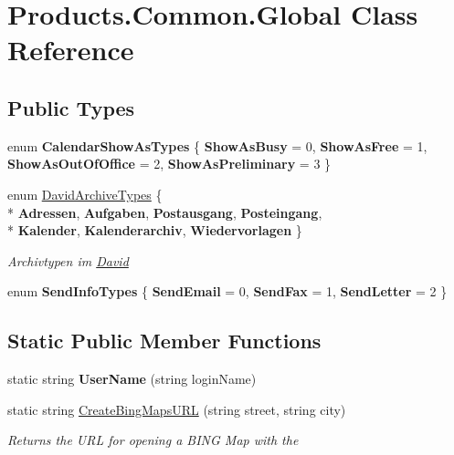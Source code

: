 \hypertarget{class_products_1_1_common_1_1_global}{}\section{Products.\+Common.\+Global Class Reference}
\label{class_products_1_1_common_1_1_global}
\subsection*{Public Types}
\begin{DoxyCompactItemize}
\item 
enum {\bfseries Calendar\+Show\+As\+Types} \{ {\bfseries Show\+As\+Busy} = 0, 
{\bfseries Show\+As\+Free} = 1, 
{\bfseries Show\+As\+Out\+Of\+Office} = 2, 
{\bfseries Show\+As\+Preliminary} = 3
 \}\hypertarget{class_products_1_1_common_1_1_global_a44e81ad1d5e09c7b93cf42c99fa81f39}{}\label{class_products_1_1_common_1_1_global_a44e81ad1d5e09c7b93cf42c99fa81f39}

\item 
enum \hyperlink{class_products_1_1_common_1_1_global_a7ede04d6b09286853ace66419c751b9c}{David\+Archive\+Types} \{ \\*
{\bfseries Adressen}, 
{\bfseries Aufgaben}, 
{\bfseries Postausgang}, 
{\bfseries Posteingang}, 
\\*
{\bfseries Kalender}, 
{\bfseries Kalenderarchiv}, 
{\bfseries Wiedervorlagen}
 \}\begin{DoxyCompactList}\small\item\em Archivtypen im \hyperlink{namespace_david}{David} \end{DoxyCompactList}
\item 
enum {\bfseries Send\+Info\+Types} \{ {\bfseries Send\+Email} = 0, 
{\bfseries Send\+Fax} = 1, 
{\bfseries Send\+Letter} = 2
 \}\hypertarget{class_products_1_1_common_1_1_global_a5eb4676526899c7d720404be21e67f30}{}\label{class_products_1_1_common_1_1_global_a5eb4676526899c7d720404be21e67f30}

\end{DoxyCompactItemize}
\subsection*{Static Public Member Functions}
\begin{DoxyCompactItemize}
\item 
static string {\bfseries User\+Name} (string login\+Name)\hypertarget{class_products_1_1_common_1_1_global_a0382321b02d7bfb36242ed10402d5a78}{}\label{class_products_1_1_common_1_1_global_a0382321b02d7bfb36242ed10402d5a78}

\item 
static string \hyperlink{class_products_1_1_common_1_1_global_a0cb9a4fd3c67c700718f26adb4ce9ba1}{Create\+Bing\+Maps\+U\+RL} (string street, string city)
\begin{DoxyCompactList}\small\item\em Returns the U\+RL for opening a B\+I\+NG Map with the \end{DoxyCompactList}\end{DoxyCompactItemize}
